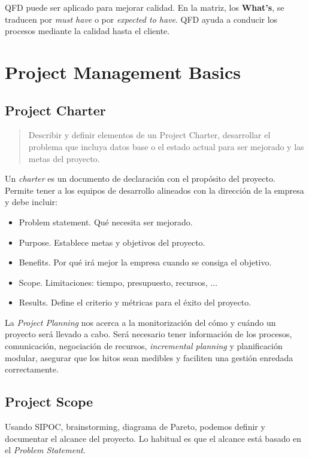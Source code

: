 \documentclass[]{article}
\begin{document}
QFD puede ser aplicado para mejorar calidad. En la matriz, los \textbf{What's}, se traducen por \textit{must have} o por \textit{expected to have}. QFD ayuda a conducir los procesos mediante la calidad hasta el cliente.

\section{Project Management Basics}

\subsection{Project Charter}

\begin{quote}
Describir y definir elementos de un Project Charter, desarrollar el problema que incluya datos base o el estado actual para ser mejorado y las metas del proyecto.
\end{quote}

Un \textit{charter} es un documento de declaración con el propósito del proyecto.
Permite tener a los equipos de desarrollo alineados con la dirección de la empresa y debe incluir: 

\begin{itemize}
	\item Problem statement. Qué necesita ser mejorado.
	\item Purpose. Establece metas y objetivos del proyecto.
	\item Benefits. Por qué irá mejor la empresa cuando se consiga el objetivo.
	\item Scope. Limitaciones: tiempo, presupuesto, recursos, ...
	\item Results. Define el criterio y métricas para el éxito del proyecto.
\end{itemize}

La \textit{Project Planning} nos acerca a la monitorización del cómo y cuándo un proyecto será llevado a cabo. Será necesario tener información de los procesos, comunicación, negociación de recursos, \textit{incremental planning} y planificación modular, asegurar que los hitos sean medibles y faciliten una gestión enredada correctamente.

\subsection{Project Scope}

Usando SIPOC, brainstorming, diagrama de Pareto, podemos definir y documentar el alcance del proyecto. Lo habitual es que el alcance está basado en el \textit{Problem Statement}.
\end{document}

